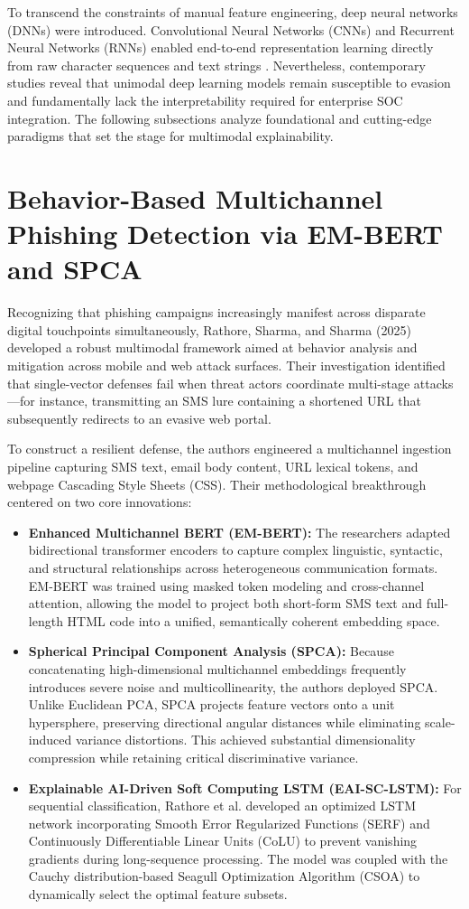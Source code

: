 To transcend the constraints of manual feature engineering, deep neural networks (DNNs) were introduced. Convolutional Neural Networks (CNNs) and Recurrent Neural Networks (RNNs) enabled end-to-end representation learning directly from raw character sequences and text strings \cite{15}. Nevertheless, contemporary studies reveal that unimodal deep learning models remain susceptible to evasion and fundamentally lack the interpretability required for enterprise SOC integration. The following subsections analyze foundational and cutting-edge paradigms that set the stage for multimodal explainability.

\section{Behavior-Based Multichannel Phishing Detection via EM-BERT and SPCA}
Recognizing that phishing campaigns increasingly manifest across disparate digital touchpoints simultaneously, Rathore, Sharma, and Sharma (2025) \cite{2} developed a robust multimodal framework aimed at behavior analysis and mitigation across mobile and web attack surfaces. Their investigation identified that single-vector defenses fail when threat actors coordinate multi-stage attacks---for instance, transmitting an SMS lure containing a shortened URL that subsequently redirects to an evasive web portal.

To construct a resilient defense, the authors engineered a multichannel ingestion pipeline capturing SMS text, email body content, URL lexical tokens, and webpage Cascading Style Sheets (CSS). Their methodological breakthrough centered on two core innovations:
\begin{itemize}
\item \textbf{Enhanced Multichannel BERT (EM-BERT):} The researchers adapted bidirectional transformer encoders to capture complex linguistic, syntactic, and structural relationships across heterogeneous communication formats. EM-BERT was trained using masked token modeling and cross-channel attention, allowing the model to project both short-form SMS text and full-length HTML code into a unified, semantically coherent embedding space.
\item \textbf{Spherical Principal Component Analysis (SPCA):} Because concatenating high-dimensional multichannel embeddings frequently introduces severe noise and multicollinearity, the authors deployed SPCA. Unlike Euclidean PCA, SPCA projects feature vectors onto a unit hypersphere, preserving directional angular distances while eliminating scale-induced variance distortions. This achieved substantial dimensionality compression while retaining critical discriminative variance.
\item \textbf{Explainable AI-Driven Soft Computing LSTM (EAI-SC-LSTM):} For sequential classification, Rathore et al. developed an optimized LSTM network incorporating Smooth Error Regularized Functions (SERF) and Continuously Differentiable Linear Units (CoLU) to prevent vanishing gradients during long-sequence processing. The model was coupled with the Cauchy distribution-based Seagull Optimization Algorithm (CSOA) to dynamically select the optimal feature subsets.
\end{itemize}

